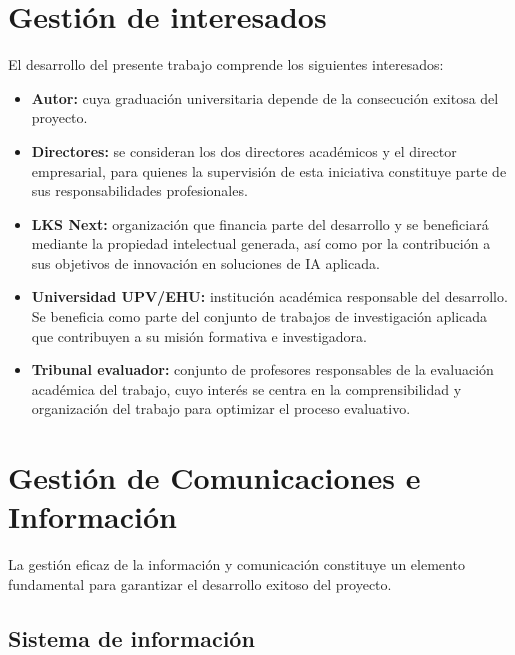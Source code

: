 \section{Gestión de interesados}
El desarrollo del presente trabajo comprende los siguientes interesados: 
\begin{itemize}
  \item \textbf{Autor: }cuya graduación universitaria depende de la consecución exitosa del proyecto.
  \item \textbf{Directores: }se consideran los dos directores académicos y el director empresarial, para quienes la supervisión de esta iniciativa constituye parte de sus responsabilidades profesionales.  
\item \textbf{LKS Next: }organización que financia parte del desarrollo y se beneficiará mediante la propiedad intelectual generada, así como por la contribución a sus objetivos de innovación en soluciones de IA aplicada.
  \item \textbf{Universidad UPV/EHU: }institución académica responsable del desarrollo. Se beneficia como parte del conjunto de trabajos de investigación aplicada que contribuyen a su misión formativa e investigadora.
  \item \textbf{Tribunal evaluador: }conjunto de profesores responsables de la evaluación académica del trabajo, cuyo interés se centra en la comprensibilidad y organización del trabajo para optimizar el proceso evaluativo.
\end{itemize}

\section{Gestión de Comunicaciones e Información}
La gestión eficaz de la información y comunicación constituye un elemento fundamental para garantizar el desarrollo exitoso del proyecto.

\subsection{Sistema de información}\label{sec:sys_info}

